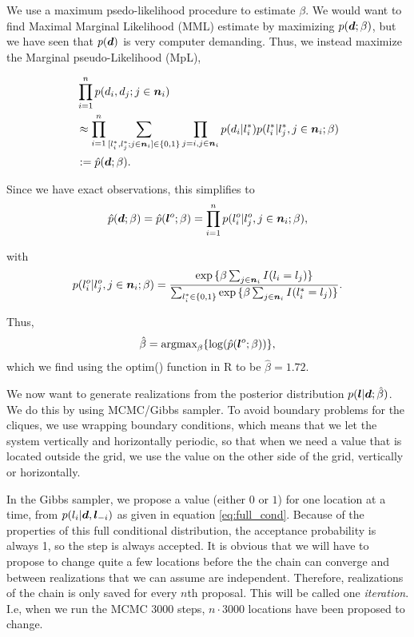 We use a maximum psedo-likelihood procedure to estimate $\beta$. We would want to find Maximal Marginal Likelihood (MML) estimate by maximizing $p(\bm{d}; \beta)$, but we have seen that $p(\bm{d})$ is very computer demanding. Thus, we instead maximize the Marginal pseudo-Likelihood (MpL), 

\begin{align*}
     &\prod_{i=1}^n p(d_i, d_j; j \in \bm{n}_i)\\
    &\approx \prod_{i=1}^n \sum_{[l_i^*, l_j^*; j\in \bm{n}_i] \in \{0,1\}} \prod_{j=i, j\in \bm{n}_i} p(d_i|l_i^*)p(l_i^*|l_j^*, j\in \bm{n}_i; \beta)\\
    &:= \hat{p}(\bm{d}; \beta).
\end{align*}
 
Since we have exact observations, this simplifies to 
\begin{equation*}
    \hat{p}(\bm{d}; \beta) = \hat{p}(\bm{l}^o; \beta) = \prod_{i=1}^n p(l_i^o|l_j^o, j\in \bm{n}_i; \beta), 
\end{equation*}

with 
\begin{equation*}
    p(l_i^o|l_j^o, j\in \bm{n}_i; \beta) = \frac{\exp{\{\beta \sum_{j\in \bm{n}_i} I(l_i = l_j)\}}}{\sum_{l_i^*\in \{0,1\}}\exp{\{\beta \sum_{j\in \bm{n}_i} I(l_i^* = l_j)\}}}.
\end{equation*}

Thus, 
\begin{equation*}
    \hat\beta = \textrm{argmax}_{\beta} \{\log(\hat{p}(\bm{l}^o; \beta))\},
\end{equation*}
which we find using the optim() function in R to be $\hat\beta = 1.72$.

We now want to generate realizations from the posterior distribution $p(\bm{l}|\bm{d}; \hat\beta)$. We do this by using MCMC/Gibbs sampler. To avoid boundary problems for the cliques, we use wrapping boundary conditions, which means that we let the system vertically and horizontally periodic, so that when we need a value that is located outside the grid, we use the value on the other side of the grid, vertically or horizontally.

In the Gibbs sampler, we propose a value (either $0$ or $1$) for one location at a time, from $p(l_i|\bm{d}, \bm{l}_{-i})$ as given in equation \eqref{eq:full_cond}.
Because of the properties of this full conditional distribution, the acceptance probability is always 1, so the step is always accepted. It is obvious that we will have to propose to change quite a few locations before the the chain can converge and between realizations that we can assume are independent. Therefore, realizations of the chain is only saved for every $n$th proposal. This will be called one \textit{iteration}. I.e, when we run the MCMC $3000$ steps, $n\cdot 3000$ locations have been proposed to change.


